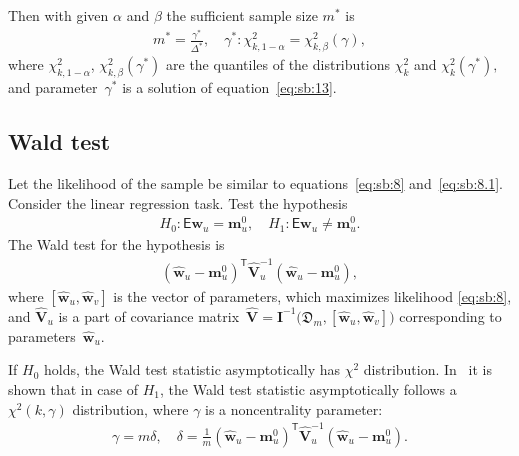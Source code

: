 \documentclass[
11pt,%
tightenlines,%
twoside,%
onecolumn,%
nofloats,%
nobibnotes,%
nofootinbib,%
superscriptaddress,%
noshowpacs,%
centertags]%
{revtex4}
\begin{document}
Then with given $\alpha$ and $\beta$ the sufficient sample size $m^*$ is
\[
\label{eq:sb:13}
\begin{aligned}
	m^* = \frac{\gamma^*}{\Delta^*}, \quad \gamma^*:\chi^2_{k, 1-\alpha} = \chi^2_{k, \beta}\left(\gamma\right), 
\end{aligned}
\]
where $\chi^2_{k, 1-\alpha}$, $\chi^2_{k, \beta}\left(\gamma^*\right)$ are the quantiles of the distributions $\chi^{2}_k$ and $\chi^2_{k}\left(\gamma^*\right),$ and parameter~$\gamma^*$ is a solution of equation~\eqref{eq:sb:13}.
	
\subsection{Wald test}
Let the likelihood of the sample be similar to equations~\eqref{eq:sb:8} and~\eqref{eq:sb:8.1}. Consider the linear regression task. Test the hypothesis
\[
\label{eq:sb:15}
\begin{aligned}
	H_0: \mathsf{E}\textbf{w}_{u} = \textbf{m}_{u}^{0}, \quad H_1: \mathsf{E}\textbf{w}_{u} \not=\textbf{m}_{u}^{0}.
\end{aligned}
\]
The Wald test for the hypothesis is
\[
\label{eq:sb:16}
\begin{aligned}
	\left(\hat{\textbf{w}}_{u} - \textbf{m}_{u}^{0}\right)^{\mathsf{T}}\hat{\textbf{V}}_{u}^{-1}\left(\hat{\textbf{w}}_{u} - \textbf{m}_{u}^{0}\right),
\end{aligned}
\]
where $[\hat{\textbf{w}}_{u},\hat{\textbf{w}}_{v}]$ is the vector of parameters, which maximizes likelihood \eqref{eq:sb:8}, and $\hat{\textbf{V}}_u$ is a part of covariance matrix~$\hat{\textbf{V}}=\mathbf{I}^{-1}\bigr(\mathfrak{D}_m, [\hat{\textbf{w}}_{u},\hat{\textbf{w}}_{v}]\bigr)$ corresponding to parameters~$\hat{\textbf{w}}_{u}$.

If $H_0$ holds, the Wald test statistic asymptotically has $\chi^2$ distribution. In~\cite{shieh2005} it is shown that in case of $H_1$, the Wald test statistic asymptotically follows a $\chi^2(k,\gamma)$ distribution, where $\gamma$ is a noncentrality parameter:
\[
\label{eq:sb:17}
\begin{aligned}
	\gamma = m\delta, \quad \delta = \frac{1}{m}\left(\hat{\textbf{w}}_{u} - \textbf{m}_{u}^{0}\right)^{\mathsf{T}}\hat{\textbf{V}}_u^{-1}\left(\hat{\textbf{w}}_{u} - \textbf{m}_{u}^{0}\right).
\end{aligned}
\]
\end{document}
